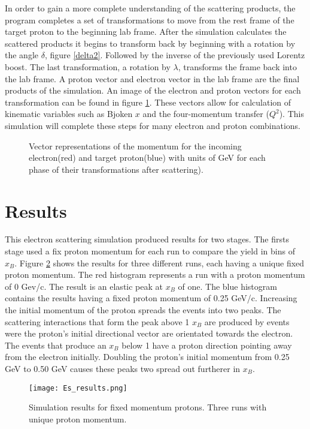   In order to gain a more complete understanding of the scattering products, the program completes a set of transformations to move from the rest frame of the target proton to the beginning lab frame. After the simulation calculates the scattered products it begins to transform back by beginning with a rotation by the angle $\delta$, figure \ref{delta2}. Followed by the inverse of the previously used Lorentz boost. The last transformation, a rotation by $\lambda$, transforms the frame back into the lab frame. A proton vector and electron vector in the lab frame are the final products of the simulation. An image of the electron and proton vectors for each transformation can be found in figure \ref{transform2}. These vectors allow for calculation of kinematic variables such as Bjoken $x$ and the four-momentum transfer ($Q^2$).  This simulation will complete these steps for many electron and proton combinations.
  \begin{figure}[h]
    \centering
    \quad
    \centering
    \vspace{-1cm}
    \centering
    \quad
    \centering
    
    \caption{Vector representations of the momentum for the incoming electron(red) and  target proton(blue) with units of GeV for each phase of their transformations after scattering).}
    \label{transform2}
    \end{figure}


\section{Results}
This electron scattering simulation produced results for two stages. The firsts stage used a fix proton momentum for each run to compare the yield in bins of $x_B$. Figure \ref{ES_res} shows the results for three different runs, each having a unique fixed proton momentum. The red histogram represents a run with a proton momentum of 0 Gev/c. The result is an elastic peak at $x_B$ of one. The blue histogram contains the results having a fixed proton momentum of 0.25 GeV/c. Increasing the initial momentum of the proton spreads the events into two peaks. The scattering interactions that form the peak above 1 $x_B$ are produced by events were the proton's initial directional vector are orientated towards the electron.  The events that produce an $x_B$ below 1 have a proton direction pointing away from the electron initially. Doubling the proton's initial momentum from 0.25 GeV to 0.50 GeV causes these peaks two spread out furtherer in $x_B$.  


\begin{figure}[h]
\centering
\caption{Simulation results for fixed momentum protons. Three runs with unique proton momentum. }
\texttt{[image: Es\_results.png]}
\label{ES_res}
\end{figure}

